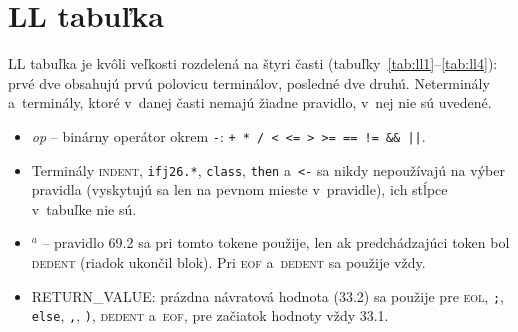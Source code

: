 \documentclass[11pt,a4paper]{article}
\begin{document}
\section{LL tabuľka}
LL tabuľka je kvôli veľkosti rozdelená na štyri časti (tabuľky~\ref{tab:ll1}--\ref{tab:ll4}): prvé dve obsahujú prvú polovicu terminálov, posledné dve druhú. Neterminály a~terminály, ktoré v~danej časti nemajú žiadne pravidlo, v~nej nie sú uvedené. 
 
\begin{itemize}
  \item \textit{op} -- binárny operátor okrem \texttt{-}: \texttt{+ * / < <= > >= == != \&\& ||}.
  \item Terminály \textsc{indent}, \texttt{ifj26.*}, \texttt{class}, \texttt{then} a~\texttt{<-} sa nikdy nepoužívajú na výber pravidla (vyskytujú sa len na pevnom mieste v~pravidle), ich stĺpce v~tabuľke nie sú.
  \item $^{a}$ -- pravidlo 69.2 sa pri tomto tokene použije, len ak predchádzajúci token bol \textsc{dedent} (riadok ukončil blok). Pri \textsc{eof} a~\textsc{dedent} sa použije vždy.
  \item \textsf{RETURN\_VALUE}: prázdna návratová hodnota (33.2) sa použije pre \textsc{eol}, \texttt{;}, \texttt{else}, \texttt{,}, \texttt{)}, \textsc{dedent} a~\textsc{eof}, pre začiatok hodnoty vždy 33.1.
\end{itemize}
 
\end{document}
